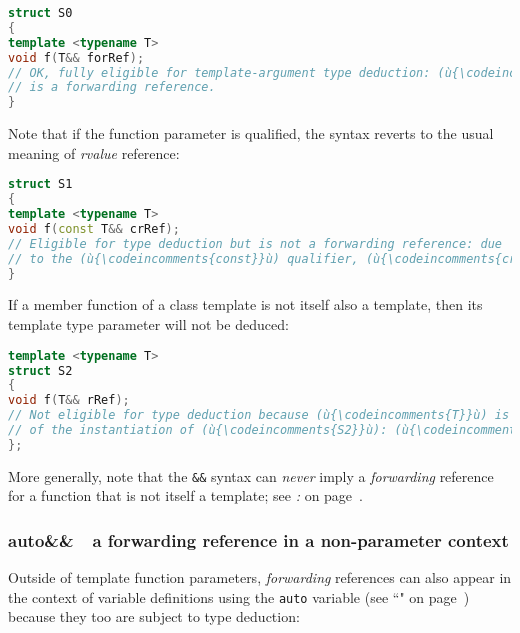 \begin{lstlisting}[language=C++]
struct S0
{
template <typename T>
void f(T&& forRef);
// OK, fully eligible for template-argument type deduction: (ù{\codeincomments{forRef}}ù)
// is a forwarding reference.
}
\end{lstlisting}

\noindent Note that if the function parameter is qualified, the syntax reverts to
the usual meaning of \emph{rvalue} reference:

\begin{lstlisting}[language=C++]
struct S1
{
template <typename T>
void f(const T&& crRef);
// Eligible for type deduction but is not a forwarding reference: due
// to the (ù{\codeincomments{const}}ù) qualifier, (ù{\codeincomments{crRef}}ù) is an *rvalue* reference.
}
\end{lstlisting}

\noindent If a member function of a class template is not itself also a template,
then its template type parameter will not be deduced:

\begin{lstlisting}[language=C++]
template <typename T>
struct S2
{
void f(T&& rRef);
// Not eligible for type deduction because (ù{\codeincomments{T}}ù) is fixed and known as part
// of the instantiation of (ù{\codeincomments{S2}}ù): (ù{\codeincomments{rRef}}ù) is an *rvalue* reference.
};
\end{lstlisting}

\noindent More generally, note that the \texttt{\&\&} syntax can \emph{never}
imply a \emph{forwarding} reference for a function that is not itself a
template; see \textit{:
} on page~\pageref{forwarding-references-look-just-like-rvalue-references}.

\subsubsection[{\tt auto\&\&} --- a forwarding reference in a non-parameter context]{{\SubsubsecCode auto\&\&}~{\subsubemdash}~a forwarding reference in a non-parameter context}\label{auto-a-forwarding-reference-in-a-non-parameter-context}

Outside of template function parameters, \emph{forwarding} references
can also appear in the context of variable definitions using the
\texttt{auto} variable (see ``" on page~\pageref{auto-feature}) because they too are subject to type
deduction:

